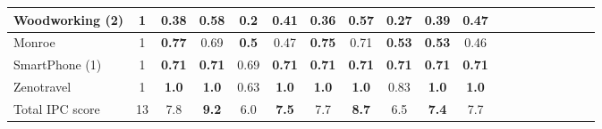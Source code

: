 \begin{table}
{\begin{tabular}{lccccccccccccccccccl}
Woodworking (2)& 1 & 0.38 & \textbf{0.58} & 0.2 & \textbf{0.41} & 0.36 & \textbf{0.57} & 0.27 & \textbf{0.39} &\multicolumn{2}{c}{ 0.47  } \\ 
\midrule 
 Monroe & 1 & \textbf{0.77} & 0.69 & \textbf{0.5} & 0.47 & \textbf{0.75} & 0.71 & \textbf{0.53} & \textbf{0.53} &\multicolumn{2}{c}{ 0.46  } \\ 
SmartPhone (1) & 1 & \textbf{0.71} & \textbf{0.71} & 0.69 & \textbf{0.71} & \textbf{0.71} & \textbf{0.71} & \textbf{0.71} & \textbf{0.71} &\multicolumn{2}{c}{ \textbf{0.71}  } \\ 
Zenotravel & 1 & \textbf{1.0} & \textbf{1.0} & 0.63 & \textbf{1.0} & \textbf{1.0} & \textbf{1.0} & 0.83 & \textbf{1.0} &\multicolumn{2}{c}{ \textbf{1.0}  } \\ 
\midrule
Total IPC score & 13 & 7.8 & \textbf{9.2} & 6.0 & \textbf{7.5} & 7.7 & \textbf{8.7} & 6.5 & \textbf{7.4} &\multicolumn{2}{c}{ 7.7  } \\ 
\bottomrule 
 \end{tabular} 
} 
\end{table} 
